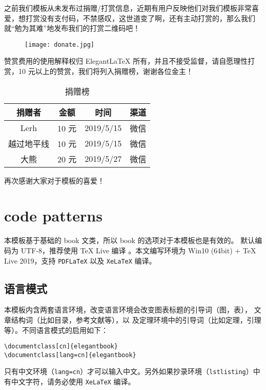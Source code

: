 \documentclass[cn,11pt]{elegantbook}
\begin{document}
之前我们模板从未发布过捐赠/打赏信息，近期有用户反映他们对我们模板非常喜爱，想打赏没有支付码，不禁感叹，这世道变了啊，还有主动打赏的，那么我们就“勉为其难”地发布我们的打赏二维码吧！

\begin{figure}[htbp]
\centering
\texttt{[image: donate.jpg]}
\end{figure}

赞赏费用的使用解释权归 Elegant\LaTeX{} 所有，并且不接受监督，请自愿理性打赏，10 元以上的赞赏，我们将列入捐赠榜，谢谢各位金主！

\begin{table}[htbp]
  \centering
  \caption{捐赠榜}
    \begin{tabular}{cccc}
    \toprule
    捐赠者   & 金额 & 时间 & 渠道 \\
    \midrule
    Lerh  & 10 元  & 2019/5/15 & 微信 \\
    越过地平线 & 10 元    & 2019/5/15 & 微信 \\
	大熊 &  20 元 & 2019/5/27 & 微信 \\
    \bottomrule
    \end{tabular}%
\end{table}%

再次感谢大家对于模板的喜爱！

\chapter{code patterns}

本模板基于基础的 book 文类，所以 book 的选项对于本模板也是有效的。
默认编码为 UTF-8，推荐使用 \TeX{} Live 编译
。本文编写环境为 Win10 (64bit) + \TeX{} Live 2019，支持 \lstinline{PDFLaTeX} 以及 \lstinline{XeLaTeX} 编译。

\section{语言模式}
本模板内含两套语言环境，改变语言环境会改变图表标题的引导词（图，表），
文章结构词（比如目录，参考文献等），以
及定理环境中的引导词（比如定理，引理等）。不同语言模式的启用如下：
\begin{lstlisting}
\documentclass[cn]{elegantbook} 
\documentclass[lang=cn]{elegantbook}
\end{lstlisting}

\begin{remark}
只有中文环境（\lstinline{lang=cn}）才可以输入中文。另外如果抄录环境（\lstinline{lstlisting}）中有中文字符，请务必使用 \lstinline{XeLaTeX} 编译。
\end{remark}
\end{document}
